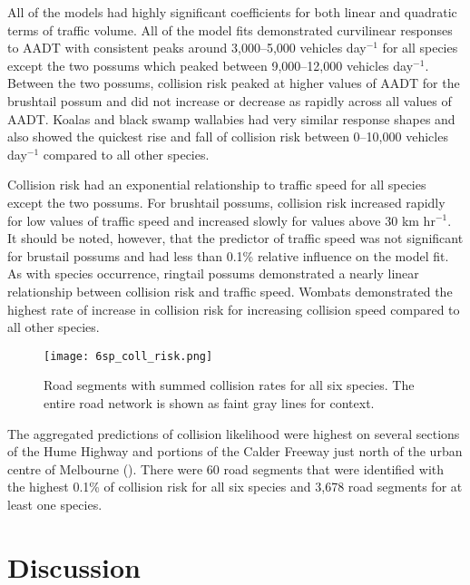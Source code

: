 All of the models had highly significant coefficients for both linear and quadratic terms of traffic volume.  All of the model fits demonstrated curvilinear responses to AADT with consistent peaks around 3,000--5,000 vehicles day$^{−1}$ for all species except the two possums which peaked between 9,000--12,000 vehicles day$^{−1}$. Between the two possums, collision risk peaked at higher values of AADT for the brushtail possum and did not increase or decrease as rapidly across all values of AADT.  Koalas and black swamp wallabies had very similar response shapes and also showed the quickest rise and fall of collision risk between 0--10,000 vehicles day$^{−1}$ compared to all other species.

Collision risk had an exponential relationship to traffic speed for all species except the two possums. For brushtail possums, collision risk increased rapidly for low values of traffic speed and increased slowly for values above 30 km hr$^{−1}$. It should be noted, however, that the predictor of traffic speed was not significant for brustail possums and had less than 0.1\% relative influence on the model fit. As with species occurrence, ringtail possums demonstrated a nearly linear relationship between collision risk and traffic speed. Wombats demonstrated the highest rate of increase in collision risk for increasing collision speed compared to all other species.

\begin{figure*}[htp]
  \centering
  \texttt{[image: 6sp\_coll\_risk.png]}
  \caption[Road segments with predictions of high collision likelihood for six mammal species]{Road segments with summed collision rates for all six species. The entire road network is shown as faint gray lines for context.}
  \label{6sp_collrisk}
\end{figure*}

The aggregated predictions of collision likelihood were highest on several sections of the Hume Highway and portions of the Calder Freeway just north of the urban centre of Melbourne (). There were 60 road segments that were identified with the highest 0.1\% of collision risk for all six species and 3,678 road segments for at least one species.

\section{Discussion}

